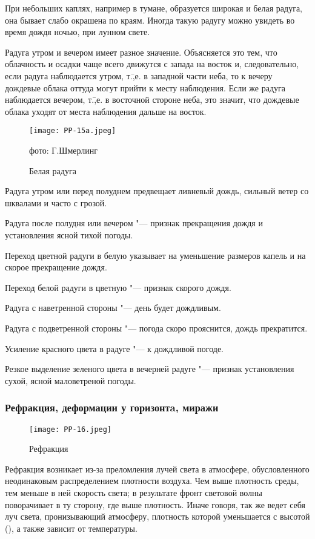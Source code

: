 При небольших каплях, например в тумане, образуется широкая и белая
радуга, она бывает слабо окрашена по краям. Иногда такую радугу можно
увидеть во время дождя ночью, при лунном свете.

Радуга утром и вечером имеет разное значение. Объясняется это тем, что
облачность и осадки чаще всего движутся с запада на восток и,
следовательно, если радуга наблюдается утром, т.\=,е. в западной части
неба, то к вечеру дождевые облака оттуда могут прийти к месту
наблюдения. Если же радуга наблюдается вечером, т.\=,е. в восточной
стороне неба, это значит, что дождевые облака уходят от места
наблюдения дальше на восток.

\begin{figure}[htb]
  \centering{}
  \texttt{[image: PP-15a.jpeg]}
  \caption{Белая радуга}
  \label{fig:pp15a}
  \small
  \centering{}фото: Г.Шмерлинг
\end{figure}

 Радуга утром или перед полуднем предвещает ливневый дождь,
сильный ветер со шквалами и часто с грозой.

 Радуга после полудня или вечером "--- признак прекращения дождя и
установления ясной тихой погоды.

 Переход цветной радуги в белую указывает на уменьшение
размеров капель и на скорое прекращение дождя.

 Переход белой радуги в цветную "--- признак скорого дождя.

 Радуга с наветренной стороны "--- день будет дождливым.

 Радуга с подветренной стороны "--- погода скоро прояснится, дождь прекратится.

 Усиление красного цвета в радуге "--- к дождливой погоде.

 Резкое выделение зеленого цвета в вечерней радуге "--- признак
установления сухой, ясной маловетреной погоды.

\subsubsection{Рефракция, деформации у горизонтa, миражи}

\begin{figure}[htb]
  \centering{}
  \texttt{[image: PP-16.jpeg]}
  \caption{Рефракция}
  \label{fig:pp16}
  \small
  \centering{}
\end{figure}

Рефракция возникает из-за преломления лучей света в атмосфере,
обусловленного неодинаковым распределением плотности воздуха. Чем выше
плотность среды, тем меньше в ней скорость света; в результате фронт
световой волны поворачивает в ту сторону, где выше плотность. Иначе
говоря, так же ведет себя луч света, пронизывающий атмосферу,
плотность которой уменьшается с высотой (), а также зависит от
температуры.

